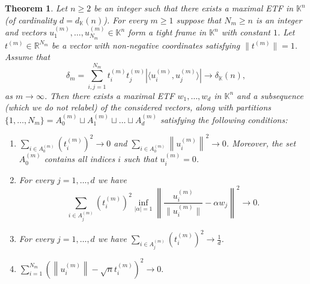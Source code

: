 \documentclass[12pt, reqno]{amsart}
\newtheorem{twr}{Theorem}[section]
\theoremstyle{definition}
\theoremstyle{remark}
\numberwithin{equation}{section}
\begin{document}
\begin{twr}
\label{twrboundstab}
Let $n \geq 2$ be an integer such that there exists a maximal ETF in $\mathbb{K}^n$ (of cardinality $d = d_{\mathbb{K}}(n)$). For every $m \geq 1$ suppose that $N_m \geq n$ is an integer and vectors $u_1^{(m)}, \ldots, u^{(m)}_{N_m} \in \mathbb{K}^n$ form a tight frame in $\mathbb{K}^n$ with constant $1$. Let $t^{(m)} \in \mathbb{R}^{N_m}$ be a vector with non-negative coordinates satisfying $\|t^{(m)}\|=1$. Assume that
$$\delta_m=\sum_{i, j=1}^{N_m} t^{(m)}_it^{(m)}_j |\langle u^{(m)}_i, u^{(m)}_j \rangle| \to \delta_{\mathbb{K}}(n),$$
as $m \to \infty$. Then there exists a maximal ETF $w_1, \ldots, w_{d}$ in $\mathbb{K}^n$ and a subsequence (which we do not relabel) of the considered vectors, along with partitions $\{1, \ldots, N_m\} = A^{(m)}_0 \sqcup A^{(m)}_1 \sqcup \ldots \sqcup A^{(m)}_d$ satisfying the following conditions:
\begin{enumerate}
\item $\sum_{i \in A^{(m)}_0} \left (t_i^{(m)} \right)^2 \to 0$ and $\sum_{i \in A^{(m)}_0} \left \|u_i^{(m)} \right \|^2 \to 0$. Moreover, the set $A^{(m)}_0$ contains all indices $i$ such that $u_i^{(m)}=0$.
\item For every $j=1, \ldots, d$ we have
$$\sum_{i \in A^{(m)}_j} (t^{(m)}_i)^2 \inf_{|\alpha|=1} \left \| \frac{u_i^{(m)}}{\|u_i^{(m)}\|} - \alpha w_j \right \|^2 \to 0.$$
\item For every $j=1, \ldots, d$ we have $\sum_{i \in A^{(m)}_j} \left (t^{(m)}_i \right )^2 \to \frac{1}{d}$.
\item $\sum_{i=1}^{N_m} \left ( \left \| u_i^{(m)} \right  \| - \sqrt{n}t_i^{(m)} \right )^2 \to 0.$
\end{enumerate}
\end{twr}
\end{document}
